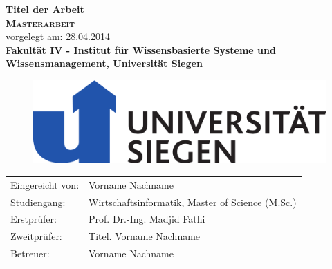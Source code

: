 \documentclass[
        ngerman,
        paper=a4,
        numbers=noendperiod,
]{scrreprt}
\begin{document}
\begin{titlepage}
    \begin{center}
    \huge \textbf{\textsf{Titel der Arbeit}} \\
    \vspace{1cm}
    \LARGE\textbf{\textsc{Masterarbeit}}\\
    \vspace{1cm}
    \normalsize
    vorgelegt am: 28.04.2014\\
    \vspace{2.5cm}
    \large \textbf{Fakultät IV - 
Institut für Wissensbasierte
Systeme und Wissensmanagement, Universität Siegen
}
\linebreak
\linebreak
\begin{figure}[H]
    \centering\includegraphics[width=0.4\linewidth]{images/logo_uni_siegen_4c_[konvertiert].pdf}
    \label{fig:Unilabel}
\end{figure}
    \end{center}
    \vspace{3cm}
    \begin{center}
 \normalsize{
    \begin{tabular}{ll}
    	Eingereicht von: & {Vorname Nachname} \\
    	Studiengang: & Wirtschaftsinformatik, Master of Science (M.Sc.)\\
	Erstprüfer: & Prof. Dr.-Ing. Madjid Fathi \\
	Zweitprüfer: & Titel. Vorname Nachname\\
      	Betreuer: &   Vorname Nachname\\
    \end{tabular}\\
    }
\end{center}
\end{titlepage}
\setcounter{page}{0}
\tableofcontents
\clearpage 
{}
\listoffigures
\clearpage 
{}
\listoftables
\clearpage 
\end{document}
